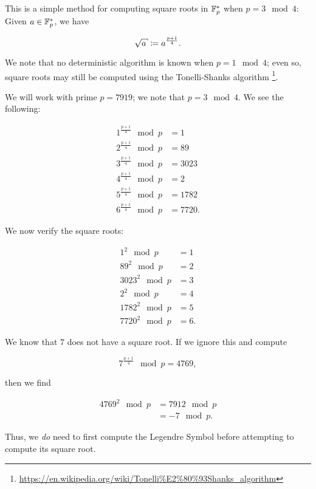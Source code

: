 This is a simple method for computing square roots
in $\mathbb{F}_{p}^{*}$ when $p = 3 \mod 4$:
Given $a\in\mathbb{F}_{p}^{*}$, we have

\begin{equation}
    \sqrt{a} \mathDef{} a^{\frac{p+1}{4}}.
\end{equation}

\noindent
We note that no deterministic algorithm
is known when $p = 1 \mod 4$;
even so, square roots may still be computed using the
Tonelli-Shanks algorithm%
\footnote{\url{https://en.wikipedia.org/wiki/Tonelli\%E2\%80\%93Shanks_algorithm}}.

\begin{example}

We will work with prime $p = 7919$;
we note that $p = 3 \mod 4$.
We see the following:

\begin{align}
    1^{\frac{p+1}{4}} \mod p &= 1
        \nonumber\\
    2^{\frac{p+1}{4}} \mod p &= 89
        \nonumber\\
    3^{\frac{p+1}{4}} \mod p &= 3023
        \nonumber\\
    4^{\frac{p+1}{4}} \mod p &= 2
        \nonumber\\
    5^{\frac{p+1}{4}} \mod p &= 1782
        \nonumber\\
    6^{\frac{p+1}{4}} \mod p &= 7720.
\end{align}

\noindent
We now verify the square roots:

\begin{align}
    1^{2} \mod p &= 1
        \nonumber\\
    89^{2} \mod p &= 2
        \nonumber\\
    3023^{2} \mod p &= 3
        \nonumber\\
    2^{2} \mod p &= 4
        \nonumber\\
    1782^{2} \mod p &= 5
        \nonumber\\
    7720^{2} \mod p &= 6.
\end{align}

We know that $7$ does not have a square root.
If we ignore this and compute

\begin{equation}
    7^{\frac{p+1}{4}} \mod p = 4769,
\end{equation}

\noindent
then we find

\begin{align}
    4769^{2} \mod p &= 7912 \mod p \nonumber\\
        &= -7 \mod p.
\end{align}

\noindent
Thus, we \emph{do} need to first compute the Legendre Symbol
before attempting to compute its square root.
\end{example}
